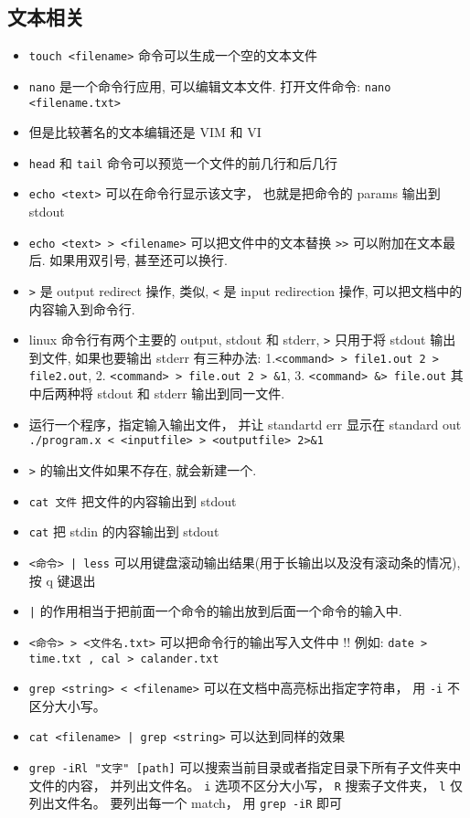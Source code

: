\subsection{文本相关}
\begin{itemize}
\item \verb`touch <filename>` 命令可以生成一个空的文本文件
\item \verb`nano` 是一个命令行应用, 可以编辑文本文件. 打开文件命令: \verb`nano <filename.txt>`
\item 但是比较著名的文本编辑还是 VIM 和 VI 
\item \verb`head` 和 \verb`tail` 命令可以预览一个文件的前几行和后几行
\item \verb`echo <text>` 可以在命令行显示该文字， 也就是把命令的 params 输出到 stdout
\item \verb`echo <text> > <filename>` 可以把文件中的文本替换 \verb`>>` 可以附加在文本最后. 如果用双引号, 甚至还可以换行.
\item \verb`>` 是 output redirect 操作, 类似, \verb`<` 是 input redirection 操作, 可以把文档中的内容输入到命令行.
\item linux 命令行有两个主要的 output, stdout 和 stderr, \verb`>` 只用于将 stdout 输出到文件, 如果也要输出 stderr 有三种办法: 1.\verb`<command> > file1.out 2 > file2.out`, 2. \verb`<command> > file.out 2 > &1`, 3. \verb`<command> &> file.out` 其中后两种将 stdout 和 stderr 输出到同一文件.
\item 运行一个程序，指定输入输出文件， 并让 standartd err 显示在 standard out \verb`./program.x < <inputfile> > <outputfile> 2>&1` 
\item \verb`>` 的输出文件如果不存在, 就会新建一个.
\item  \verb`cat 文件` 把文件的内容输出到 stdout
\item  \verb`cat` 把 stdin 的内容输出到 stdout
\item \verb`<命令> | less` 可以用键盘滚动输出结果(用于长输出以及没有滚动条的情况), 按 q 键退出
\item \verb`|` 的作用相当于把前面一个命令的输出放到后面一个命令的输入中.
\item \verb`<命令> > <文件名.txt>` 可以把命令行的输出写入文件中 !! 例如: \verb`date > time.txt , cal > calander.txt`
\item \verb`grep <string> < <filename>` 可以在文档中高亮标出指定字符串， 用 \verb|-i| 不区分大小写。
\item \verb`cat <filename> | grep <string>` 可以达到同样的效果
\item \verb`grep -iRl "文字" [path]` 可以搜索当前目录或者指定目录下所有子文件夹中文件的内容， 并列出文件名。 \verb`i` 选项不区分大小写， \verb`R` 搜索子文件夹， \verb`l` 仅列出文件名。 要列出每一个 match， 用 \verb`grep -iR` 即可

\end{itemize}
